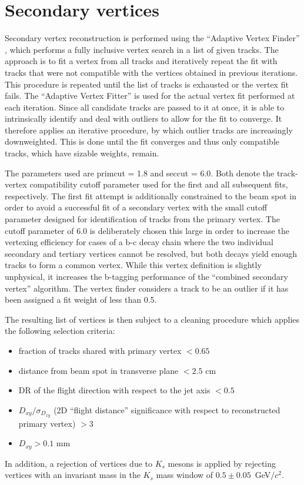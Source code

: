 \clearpage
\section{Secondary vertices \label{sec:secondaryvertex}}
Secondary vertex reconstruction is performed using the “Adaptive Vertex Finder” \cite{bib:AVF}, which performs a fully inclusive vertex search in a list of given tracks. The approach is to fit a vertex from all tracks
and iteratively repeat the fit with tracks that were not compatible with the vertices obtained
in previous iterations. This procedure is repeated until the list of tracks is exhausted or the
vertex fit fails. The “Adaptive Vertex Fitter” is used for the actual vertex fit performed at each
iteration. Since all candidate tracks are passed to it at once, it is able to intrinsically identify and
deal with outliers to allow for the fit to converge. It therefore applies an iterative procedure, by which outlier tracks are increasingly downweighted. This is done until the fit converges and
thus only compatible tracks, which have sizable weights, remain.

The parameters used are primcut = 1.8 and seccut = 6.0. Both denote the track-vertex compatibility
cutoff parameter used for the first and all subsequent fits, respectively. The first fit
attempt is additionally constrained to the beam spot in order to avoid a successful fit of a secondary
vertex with the small cutoff parameter designed for identification of tracks from the
primary vertex. The cutoff parameter of 6.0 is deliberately chosen this large in order to increase
the vertexing efficiency for cases of a b-c decay chain where the two individual secondary and
tertiary vertices cannot be resolved, but both decays yield enough tracks to form a common
vertex. While this vertex definition is slightly unphysical, it increases the b-tagging performance
of the “combined secondary vertex” algorithm. The vertex finder considers a track to
be an outlier if it has been assigned a fit weight of less than 0.5.

The resulting list of vertices is then subject to a cleaning procedure which applies the following
selection criteria:
\begin{itemize}
\item fraction of tracks shared with primary vertex $< 0.65$
\item distance from beam spot in transverse plane $< 2.5$ cm
\item DR of the flight direction with respect to the jet axis $< 0.5$
\item $D_{xy}/\sigma_{D_{xy}}$ (2D “flight distance” significance with respect to reconstructed primary
vertex) $> 3$
\item $D_{xy} > 0.1$ mm
\end{itemize}
In addition, a rejection of vertices due to $K_s$ mesons is applied by rejecting vertices with an invariant mass in the $K_s$ mass window of $0.5 \pm 0.05$~GeV$/c^2$. 


